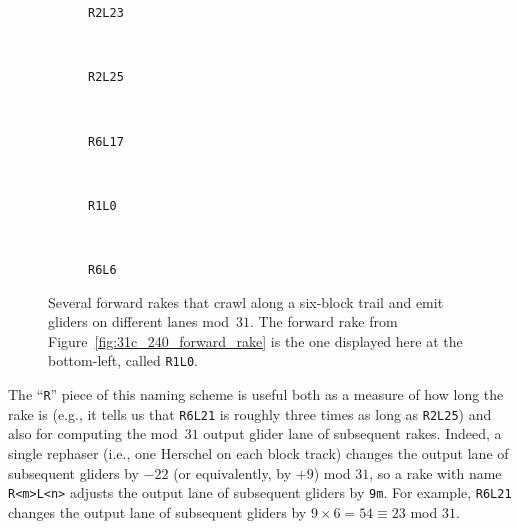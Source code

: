\begin{figure}[!htb]
	\centering
	\begin{minipage}{0.3\textwidth}
		\begin{subfigure}{\linewidth}
			\centering
			\caption{\texttt{R2L23}}\label{fig:R2L23}
		\end{subfigure} \\[0.1cm] \begin{subfigure}{\linewidth}
			\centering
			\caption{\texttt{R2L25}}\label{fig:R2L25}
		\end{subfigure}
	\end{minipage} \ \ \ \begin{subfigure}{0.66\textwidth}
		\centering
		\caption{\texttt{R6L17}}\label{fig:R6L17}
	\end{subfigure} \\[0.1cm]
	\begin{subfigure}{0.3\textwidth}
		\centering
		\caption{\texttt{R1L0}}\label{fig:R1L0}
	\end{subfigure} \ \ \ \begin{subfigure}{0.66\textwidth}
		\centering
		\caption{\texttt{R6L6}}\label{fig:R6L6}
	\end{subfigure}
	\caption{Several forward rakes that crawl along a six-block trail and emit gliders on different lanes mod~$31$. The forward rake from Figure~\ref{fig:31c_240_forward_rake} is the one displayed here at the bottom-left, called \texttt{R1L0}.}\label{fig:31c_240_forerakes}
\end{figure}

The ``\texttt{R}'' piece of this naming scheme is useful both as a measure of how long the rake is (e.g., it tells us that \texttt{R6L21} is roughly three times as long as \texttt{R2L25}) and also for computing the mod~$31$ output glider lane of subsequent rakes. Indeed, a single rephaser (i.e., one Herschel on each block track) changes the output lane of subsequent gliders by $-22$ (or equivalently, by $+9$) mod $31$, so a rake with name \texttt{R<m>L<n>} adjusts the output lane of subsequent gliders by \texttt{9m}. For example, \texttt{R6L21} changes the output lane of subsequent gliders by $9 \times 6 = 54 \equiv 23$ mod $31$.

